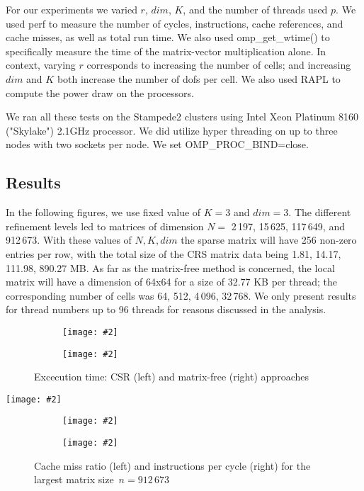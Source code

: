 \documentclass[12pt]{article}
\newcommand{\includegraphicsw}[2][1.]{\texttt{[image: \#2]}}
\begin{document}
For our experiments we varied $r$, $dim$, $K$, and the number of threads used $p$. We used perf to measure the number of cycles, instructions, cache references, and cache misses, as well as total run time. We also used omp\_get\_wtime() to specifically measure the time of the matrix-vector multiplication alone. In context, varying $r$ corresponds to increasing the number of cells; and increasing $dim$ and $K$ both increase the number of dofs per cell. We also used RAPL to compute the power draw on the processors.

We ran all these tests on the Stampede2 clusters using Intel Xeon Platinum 8160 ("Skylake") 2.1GHz processor. We did utilize hyper threading on up to three nodes with two sockets per node. We set OMP\_PROC\_BIND=close.

\subsection{Results}
In the following figures, we use fixed value of $K = 3$ and $dim = 3$. The different refinement levels led to matrices of dimension $N =$ 2\,197, 15\,625, 117\,649, and 912\,673. With these values of $N, K, dim$ the sparse matrix will have 256 non-zero entries per row, with the total size of the CRS matrix data being 1.81, 14.17, 111.98, 890.27 MB. As far as the matrix-free method is concerned, the local matrix will have a dimension of 64x64 for a size of 32.77 KB per thread; the corresponding number of cells was 64, 512, 4\,096, 32\,768. We only present results for thread numbers up to 96 threads for reasons discussed in the analysis.

\begin{figure}[H]
	\centering
	\begin{subfigure}{.5\linewidth}
		\includegraphicsw{clTime.pdf}
	\end{subfigure}%
	\begin{subfigure}{.5\linewidth}
		\includegraphicsw{mfTime.pdf}
	\end{subfigure}%
	\caption{Excecution time: CSR (left) and matrix-free (right) approaches}\label{fig:time}
\end{figure}

\begin{table}[H]
	\centering\caption{Best thread team sizes (see Figure~\ref{fig:time})}
	\includegraphicsw[.9]{bestTime.pdf}
\end{table}

\begin{figure}[H]
	\centering
	\begin{subfigure}{.5\linewidth}
		\includegraphicsw{cache.pdf}
	\end{subfigure}%
	\begin{subfigure}{.5\linewidth}
		\includegraphicsw{inst.pdf}
	\end{subfigure}
	\caption{Cache miss ratio (left) and instructions per cycle (right) for the largest matrix size~$n = 912\,673$}
\end{figure}
\end{document}
